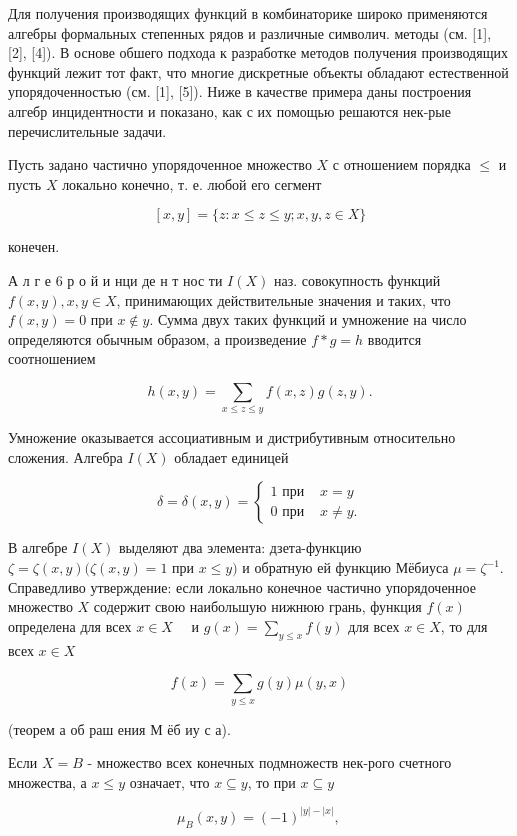 \documentclass[10pt]{article}
\begin{document}
Для получения производящих функций в комбинаторике широко применяются алгебры формальных степенных рядов и различные символич. методы (см. [1], [2], [4]). В основе обшего подхода к разработке методов получения производящих функций лежит тот факт, что многие дискретные объекты обладают естественной упорядоченностью (см. [1], [5]). Ниже в качестве примера даны построения алгебр инцидентности и показано, как с их помощью решаются нек-рые перечислительные задачи.

Пусть задано частично упорядоченное множество $X$ с отношением порядка $\leqslant$ и пусть $X$ локально конечно, т. е. любой его сегмент

\[
[x, y]=\{z: x \leqslant z \leqslant y ; x, y, z \in X\}
\]

конечен.

А л г е 6 р о й и нци де н т нос ти $I(X)$ наз. совокупность функций $f(x, y), x, y \in X$, принимающих действительные значения и таких, что $f(x, y)=0$ при $x \notin y$. Сумма двух таких функций и умножение на число определяются обычным образом, а произведение $f * g=h$ вводится соотношением

\[
h(x, y)=\sum_{x \leqslant z \leqslant y} f(x, z) g(z, y) .
\]

Умножение оказывается ассоциативным и дистрибутивным относительно сложения. Алгебра $I(X)$ обладает единицей

\[
\delta=\delta(x, y)=\left\{\begin{array}{lll}
1 \text { при } & x=y \\
0 \text { при } & x \neq y .
\end{array}\right.
\]

В алгебре $I(X)$ выделяют два элемента: дзета-функцию $\zeta=\zeta(x, y)(\zeta(x, y)=1$ при $x \leqslant y)$ и обратную ей функцию Мёбиуса $\mu=\zeta^{-1}$. Справедливо утверждение: если локально конечное частично упорядоченное множество $X$ содержит свою наибольшую нижнюю грань, функция $f(x)$ определена для всех $x \in X \quad$ и $g(x)=\sum_{y \leqslant x} f(y)$ для всех $x \in X$, то для всех $x \in X$

\[
f(x)=\sum_{y \leqslant x} g(y) \mu(y, x)
\]

(теорем а об раш ения М ёб иу с а).

Если $X=B$ - множество всех конечных подмножеств нек-рого счетного множества, а $x \leqslant y$ означает, что $x \subseteq y$, то при $x \subseteq y$

\[
\mu_{B}(x, y)=(-1)^{|y|-|x|} \text {, }
\]
\end{document}

